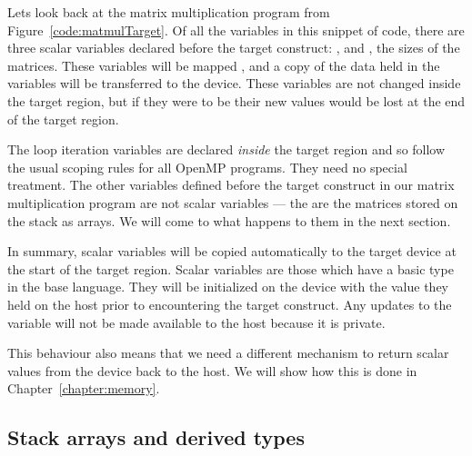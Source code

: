 Lets look back at the matrix multiplication program from Figure~\ref{code:matmulTarget}.
Of all the variables in this snippet of code, there are three scalar variables declared before the target construct: ,  and , the sizes of the matrices.
These variables will be mapped , and a copy of the data held in the variables will be transferred to the device.
These variables are not changed inside the target region, but if they were to be their new values would be lost at the end of the target region.

The loop iteration variables are declared \emph{inside} the target region and so follow the usual scoping rules for all OpenMP programs.
They need no special treatment.
The other variables defined before the target construct in our matrix multiplication program are not scalar variables --- the are the matrices stored on the stack as arrays.
We will come to what happens to them in the next section.

In summary, scalar variables will be copied automatically to the target device at the start of the target region.
Scalar variables are those which have a basic type in the base language.
They will be initialized on the device with the value they held on the host prior to encountering the target construct.
Any updates to the variable will not be made available to the host because it is private.

This behaviour also means that we need a different mechanism to return scalar values from the device back to the host.
We will show how this is done in Chapter~\ref{chapter:memory}.


\subsection{Stack arrays and derived types}


